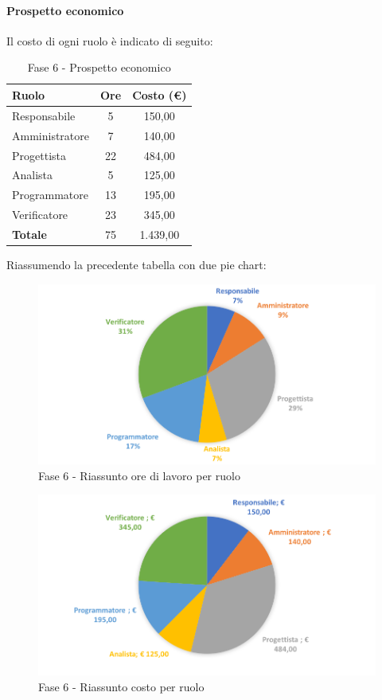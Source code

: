 \documentclass[../PianoDiProgetto.tex]{subfiles}
\begin{document}
			\newpage
			\paragraph{Prospetto economico}
			Il costo di ogni ruolo è indicato di seguito:
			\begin{table}[h]
				\centering
				\begin{tabular}{l * {2}{c}}
				\toprule
				\textbf{Ruolo} & \textbf{Ore} & \textbf{Costo (\euro{})} \\
				\midrule
				Responsabile & 5 & 150,00 \\
				Amministratore & 7 & 140,00 \\
				Progettista & 22 & 484,00 \\
				Analista & 5 & 125,00 \\		
				Programmatore & 13 & 195,00 \\		
				Verificatore & 23 & 345,00 \\				
				\midrule		
				\textbf{Totale} & 75 & 1.439,00 \\
				\bottomrule	
				\end{tabular}
				\caption{Fase 6 - Prospetto economico}		
			\end{table}
			
			Riassumendo la precedente tabella con due pie chart:	
			\begin{figure}[!h]
				\centering
				\includegraphics[width=\textwidth]{Preventivo/Immagini/fase6_oreRuolo.png}
				\caption{Fase 6 - Riassunto ore di lavoro per ruolo}
			\end{figure}	
			\newpage
			\begin{figure}[!h]
				\centering
				\includegraphics[width=\textwidth]{Preventivo/Immagini/fase6_costoRuolo.png}
				\caption{Fase 6 - Riassunto costo per ruolo}
			\end{figure}	
\end{document}
